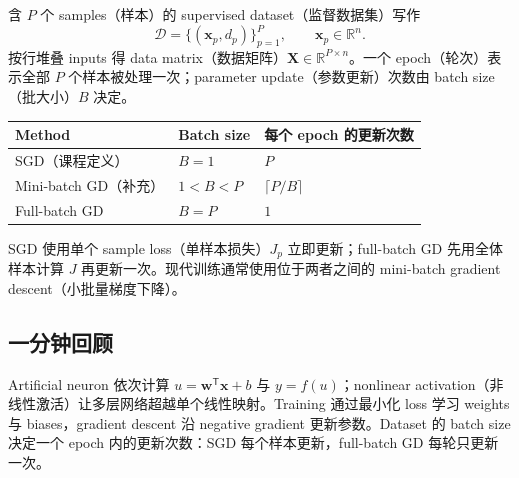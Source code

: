 
含 $P$ 个 samples（样本）的 supervised dataset（监督数据集）写作
\[
  \mathcal D=\{(\bm x_p,d_p)\}_{p=1}^{P},
  \qquad \bm x_p\in\mathbb R^n.
\]
按行堆叠 inputs 得 data matrix（数据矩阵）$\bm X\in\mathbb R^{P\times n}$。一个 epoch（轮次）表示全部 $P$ 个样本被处理一次；parameter update（参数更新）次数由 batch size（批大小）$B$ 决定。

\begin{center}
\small
\begin{tabularx}{0.92\textwidth}{@{}>{\raggedright\arraybackslash}p{3.2cm}>{\raggedright\arraybackslash}p{2.6cm}X@{}}
  \toprule
  Method & Batch size & 每个 epoch 的更新次数 \\
  \midrule
  SGD（课程定义） & $B=1$ & $P$ \\
  Mini-batch GD（补充） & $1<B<P$ & $\lceil P/B\rceil$ \\
  Full-batch GD & $B=P$ & $1$ \\
  \bottomrule
\end{tabularx}
\end{center}

SGD 使用单个 sample loss（单样本损失）$J_p$ 立即更新；full-batch GD 先用全体样本计算 $J$ 再更新一次。现代训练通常使用位于两者之间的 mini-batch gradient descent（小批量梯度下降）。

\subsection{一分钟回顾}

Artificial neuron 依次计算 $u=\bm w^{\mathsf T}\bm x+b$ 与 $y=f(u)$；nonlinear activation（非线性激活）让多层网络超越单个线性映射。Training 通过最小化 loss 学习 weights 与 biases，gradient descent 沿 negative gradient 更新参数。Dataset 的 batch size 决定一个 epoch 内的更新次数：SGD 每个样本更新，full-batch GD 每轮只更新一次。
